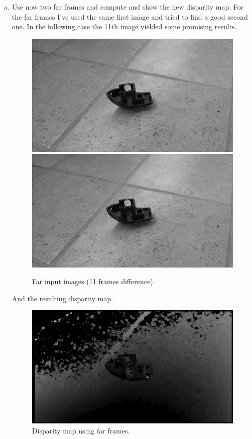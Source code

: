 \documentclass[UTF-8]{article}
\begin{document}
\begin{enumerate}[a.]
		
		
		\newpage
		\item Use now two far frames and compute and show the new disparity map.
		For the far frames I've used the same first image and tried to find a good second one. In the following case the 11th image yielded some promising results.
		\begin{figure}[H]
			\centering
			\includegraphics[width=0.7\linewidth]{images/exercise1/videooutimg1}
			\includegraphics[width=0.7\linewidth]{images/exercise1/videooutimg3}
			\caption{Far input images (11 frames difference).}
			\label{fig:videooutimg3}
		\end{figure}
		And the resulting disparity map.
		\begin{figure}[H]
			\centering
			\includegraphics[width=0.7\linewidth]{images/exercise1/videodisparity_far.png}
			\caption{Disparity map using far frames.}
			\label{fig:disparityfar}
		\end{figure}
		

\end{enumerate}
\end{document}

